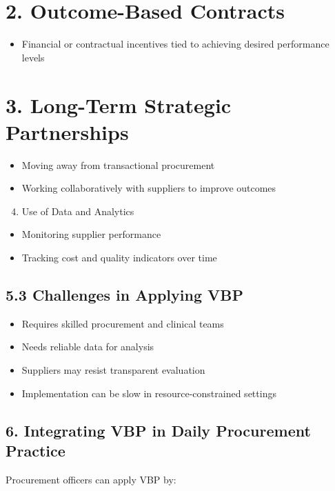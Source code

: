 \documentclass[10pt]{article}
\begin{document}
\section*{2. Outcome-Based Contracts}
\begin{itemize}
  \item Financial or contractual incentives tied to achieving desired performance levels
\end{itemize}

\section*{3. Long-Term Strategic Partnerships}
\begin{itemize}
  \item Moving away from transactional procurement
  \item Working collaboratively with suppliers to improve outcomes
\end{itemize}

\begin{enumerate}
  \setcounter{enumi}{3}
  \item Use of Data and Analytics
\end{enumerate}

\begin{itemize}
  \item Monitoring supplier performance
  \item Tracking cost and quality indicators over time
\end{itemize}

\subsection*{5.3 Challenges in Applying VBP}
\begin{itemize}
  \item Requires skilled procurement and clinical teams
  \item Needs reliable data for analysis
  \item Suppliers may resist transparent evaluation
  \item Implementation can be slow in resource-constrained settings
\end{itemize}

\subsection*{6. Integrating VBP in Daily Procurement Practice}
Procurement officers can apply VBP by:
\end{document}
